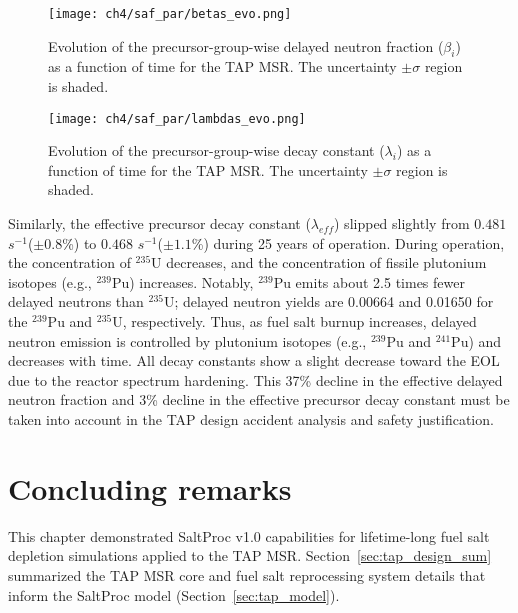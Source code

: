 \begin{figure}[htbp!] %
	\centering
	\texttt{[image: ch4/saf\_par/betas\_evo.png]}
		\vspace{-5mm}
	\caption{Evolution of the precursor-group-wise delayed neutron fraction 
	($\beta_i$) as a function of time for the \gls{TAP} \gls{MSR}. The 
	uncertainty $\pm\sigma$ 
	region is shaded.}
	\label{fig:beta-eol}
\end{figure}
\begin{figure}[hbbp!] %
	\centering
	\texttt{[image: ch4/saf\_par/lambdas\_evo.png]}
	\vspace{-5mm}
	\caption{Evolution of the precursor-group-wise decay constant 
	($\lambda_i$) as a function of time for the \gls{TAP} \gls{MSR}. The 
	uncertainty $\pm\sigma$ region is shaded.}
	\label{fig:lamda-eol}
\end{figure}

Similarly, the effective precursor decay constant ($\lambda_{eff}$) slipped 
slightly from $0.481$ $s^{-1}$($\pm0.8$\%) to $0.468$ $s^{-1}$($\pm1.1$\%) 
during 25 years of operation. During operation, the concentration of $^{235}$U 
decreases, and the concentration of fissile plutonium isotopes (e.g., 
$^{239}$Pu) 
increases. Notably, $^{239}$Pu emits about 2.5 times fewer delayed neutrons 
than $^{235}$U; delayed neutron yields are 0.00664 and 0.01650 for the 
$^{239}$Pu and $^{235}$U, respectively. Thus, as fuel salt burnup increases, 
delayed neutron emission is controlled by plutonium isotopes (e.g., $^{239}$Pu 
and $^{241}$Pu) and decreases with time. All decay constants show a slight 
decrease toward the \gls{EOL} due to the reactor spectrum hardening. This 37\% 
decline in the effective delayed neutron fraction and 3\% decline in the 
effective precursor decay constant must be taken into account in the \gls{TAP} 
design accident analysis and safety justification.



\newpage
\section{Concluding remarks}
This chapter demonstrated SaltProc v1.0 capabilities for lifetime-long fuel 
salt depletion simulations applied to the \gls{TAP} \gls{MSR}. 
Section~\ref{sec:tap_design_sum} summarized the \gls{TAP} \gls{MSR} core and 
fuel salt reprocessing system details that inform the SaltProc model 
(Section~\ref{sec:tap_model}). 
 
